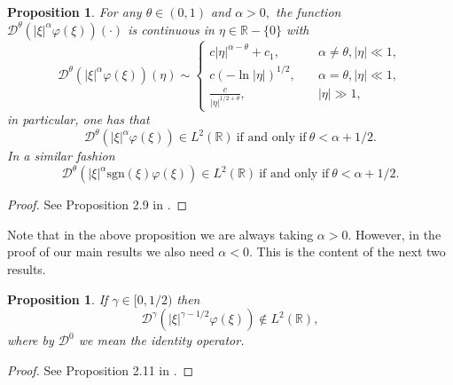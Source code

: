 \documentclass[reqno]{amsart}
\newcommand{\R}{\mathbb R}
\newcommand{\sgn}{\text{sgn}}
\numberwithin{equation}{section}
\newtheorem{proposition}[theorem]{Proposition}
\begin{document}
\begin{proposition}\label{Dstein}
For any $\theta \in (0,1)$ and $\alpha >0,$ the function $\mathcal{D}^\theta (|\xi|^\alpha \varphi (\xi))(\cdot)$ is continuous in $\eta \in \R-\{0\}$  with
$$\mathcal{D}^\theta (|\xi|^\alpha \varphi(\xi))(\eta) \sim \left\{\begin{array}{lcc}
c|\eta|^{\alpha -\theta}+c_1,& \quad \alpha \not= \theta, |\eta|\ll 1, \\
c(-\ln |\eta|)^{1/2}, & \quad \alpha=\theta, |\eta|\ll 1,\\
\frac{c}{|\eta|^{1/2+\theta}}, & \quad  |\eta|\gg 1,
\end{array}\right.
$$
 in particular, one has that
\begin{equation}\label{Dstein4}
\mathcal{D}^\theta (|\xi|^\alpha \varphi (\xi))\in L^{2}(\R) \ \mbox{if and only if} \ \theta< \alpha +1/2.
\end{equation}
In a similar fashion
\begin{equation}\label{Dstein1}
\mathcal{D}^\theta (|\xi|^\alpha \sgn(\xi) \varphi (\xi))\in L^{2}(\R) \ \mbox{if and only if} \ \theta< \alpha +1/2.
\end{equation}
\end{proposition}
\begin{proof}
See Proposition 2.9 in \cite{FLP1}.
\end{proof}

Note that in the above proposition we are always taking $\alpha>0$. However, in the proof of our main results we also need $\alpha<0$. This is the content of the next two results.

\begin{proposition}\label{DsteinL2}
If $\gamma \in [0,1/2)$ then
\begin{equation}\label{Dstein2}
\mathcal{D}^\gamma (|\xi|^{\gamma-1/2}\varphi (\xi))\notin L^{2}(\R),
\end{equation}
where by $\mathcal{D}^0$ we mean the identity operator.
\end{proposition}
\begin{proof}
See Proposition 2.11 in \cite{dBO}.
\end{proof}
\end{document}

